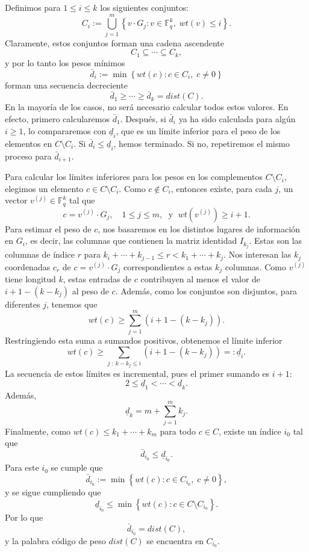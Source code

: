 Definimos para $1 \leq i \leq k$ los siguientes conjuntos:
\[
    C_i := \bigcup_{j=1}^m \left\{ v \cdot G_j : v \in \mathbb{F}_q^k, \; wt(v) \leq i \right\}.
\]
Claramente, estos conjuntos forman una cadena ascendente
\[
    C_1 \subseteq \cdots \subseteq C_k,
\]
y por lo tanto los pesos mínimos
\[
    \bar{d}_i := \min \left\{ wt(c) : c \in C_i, \; c \neq 0 \right\}
\]
forman una secuencia decreciente
\[
    \bar{d}_1 \geq \cdots \geq \bar{d}_k = dist(C).
\]
En la mayoría de los casos, no será necesario calcular todos estos valores. En efecto, primero calcularemos $\bar{d}_1$. Después, si $\bar{d}_i$ ya ha sido calculada para algún $i \geq 1$, lo compararemos con $\underline{d}_i$, que es un límite inferior para el peso de los elementos en $C \setminus C_i$. Si $\bar{d}_i \leq \underline{d}_i$, hemos terminado. Si no, repetiremos el mismo proceso para $\bar{d}_{i+1}$.

Para calcular los límites inferiores para los pesos en los complementos $C \setminus C_i$, elegimos un elemento $c \in C \setminus C_i$. Como $c \notin C_i$, entonces existe, para cada $j$, un vector $v^{(j)} \in \mathbb{F}_q^k$ tal que
\[
    c = v^{(j)} \cdot G_j, \quad 1 \leq j \leq m, \; \text{ y } \; wt(v^{(j)}) \geq i + 1.
\]
Para estimar el peso de $c$, nos basaremos en los distintos lugares de información en $G_i$, es decir, las columnas que contienen la matriz identidad $I_{k_j}$. Estas son las columnas de índice $r$ para $k_i + \cdots + k_{j-1} \leq r < k_1 + \cdots + k_j$. Nos interesan las $k_j$ coordenadas $c_r$ de $c = v^{(j)} \cdot G_j$ correspondientes a estas $k_j$ columnas. Como $v^{(j)}$ tiene longitud $k$, estas entradas de $c$ contribuyen al menos el valor de $i + 1 - (k - k_j)$ al peso de $c$. Además, como los conjuntos son disjuntos, para diferentes $j$, tenemos que 
\[
    wt(c) \geq \sum_{j=1}^m \left( i + 1 - (k - k_j) \right).
\]
Restringiendo esta suma a sumandos positivos, obtenemos el límite inferior
\[
    wt(c) \geq \sum_{j \; : \: k - k_j \leq i} \left( i + 1 - (k - k_j) \right) =: \underline{d}_i.
\]
La secuencia de estos límites es incremental, pues el primer sumando es $i + 1$:
\[
    2 \leq \underline{d}_1 < \cdots < \underline{d}_k.
\]
Además,
\[
    \underline{d}_k = m + \sum_{j=1}^m k_j.
\]
Finalmente, como $wt(c) \leq k_1 + \cdots + k_m$ para todo $c \in C$, existe un índice $i_0$ tal que
\[
    \bar{d}_{i_0} \leq \underline{d}_{i_0}.
\]
Para este $i_0$ se cumple que
\[
    \bar{d}_{i_0} := \min \left\{ wt(c) : c \in C_{i_0}, \; c \neq 0 \right\},
\]
y se sigue cumpliendo que 
\[
    \underline{d}_{i_0} \leq \min \left\{ wt(c) : c \in C \setminus C_{i_0} \right\}.
\]
Por lo que
\[
    \bar{d}_{i_0} = dist(C),
\]
y la palabra código de peso $dist(C)$ se encuentra en $C_{i_0}$.

